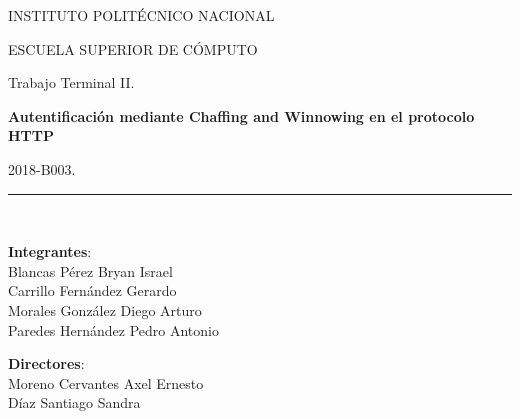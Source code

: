 \documentclass[12pt, a4paper, titlepage]{report}
\begin{document}
\begin{titlepage}
		\begin{center}
			
			\begin{LARGE}
				\textcolor{guindapoli}{INSTITUTO POLITÉCNICO NACIONAL}\\
			\end{LARGE}	
			
			\vspace*{0.2in}
			
			\begin{Large}
				\textcolor{azulescom}{ESCUELA SUPERIOR DE CÓMPUTO}\\
			\end{Large}		
			
			\vspace*{0.4in}
			
			\begin{large}
				Trabajo Terminal II.\\
			\end{large}
			
			\vspace*{0.2in}
			
			\begin{Large}
				\textbf{Autentificación mediante Chaffing and Winnowing en el protocolo HTTP}\\
			\end{Large}
			
			\vspace*{0.2in}
			
			\begin{large}
				2018-B003.\\
			\end{large}
			
			\vspace*{0.2in}
			
			\rule{80mm}{.1mm}\\
			\vspace*{0.1in}
			
			\begin{large}
				\begin{center}
					\textbf{Integrantes}:\\
					Blancas Pérez Bryan Israel\\
					Carrillo Fernández Gerardo\\
					Morales González Diego Arturo\\
					Paredes Hernández Pedro Antonio\\
				\end{center}
			\end{large}
			
			\begin{large}
				\textbf{Directores}:\\
				Moreno Cervantes Axel Ernesto\\
				Díaz Santiago Sandra\\
			\end{large}
			
		\end{center}
	
	\end{titlepage}
\end{document}
